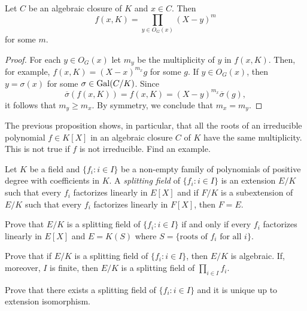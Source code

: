 \begin{proposition}
    Let $C$ be an algebraic closure of $K$ and $x\in C$. Then 
    \[
    f(x,K)=\prod_{y\in O_G(x)}(X-y)^m
    \]
    for some $m$. 
\end{proposition}

\begin{proof}
    For each $y\in O_G(x)$ let $m_y$ be the multiplicity
    of $y$ in $f(x,K)$. 
    Then, for example,
    $f(x,K)=(X-x)^{m_x}g$ for some $g$. If $y\in O_G(x)$, 
    then $y=\sigma(x)$ for some $\sigma\in\operatorname{Gal}(C/K)$. Since
    \[
    \overline{\sigma}(f(x,K))=f(x,K)=(X-y)^{m_x}\overline{\sigma}(g), 
    \]
    it follows that $m_y\geq m_x$. By symmetry, 
    we conclude that $m_x=m_y$. 
\end{proof}

The previous proposition shows, in particular, 
that all the roots of 
an irreducible polynomial $f\in K[X]$ 
in an algebraic closure $C$ of $K$
have the same multiplicity. This is  
not true if $f$ is not irreducible. Find an example.



\begin{definition}
    Let $K$ be a field and $\{f_i:i\in I\}$ be a non-empty 
    family of polynomials of positive degree
    with coefficients in $K$. A \emph{splitting field} 
    of $\{f_i:i\in I\}$ is an extension $E/K$
    such that every $f_i$ factorizes linearly in $E[X]$ and 
    if $F/K$ is a subextension of $E/K$ such that every $f_i$ 
    factorizes linearly in $F[X]$, then $F=E$. 
\end{definition}

\begin{exercise}
    Prove that $E/K$ is a splitting field of
    $\{f_i:i\in I\}$ if and only if every $f_i$ factorizes linearly 
    in $E[X]$ and $E=K(S)$ where $S=\{\text{roots of $f_i$ for all $i$}\}$. 
\end{exercise}

\begin{exercise}
    Prove that if $E/K$ is a splitting field
    of $\{f_i:i\in I\}$, then $E/K$ is algebraic. If, moreover, 
    $I$ is finite, then $E/K$ is a splitting field
    of $\prod_{i\in I}f_i$. 
\end{exercise}

\begin{exercise}
    Prove that 
    there exists a splitting field of $\{f_i:i\in I\}$ 
    and it is unique up to extension isomorphism. 
\end{exercise}

